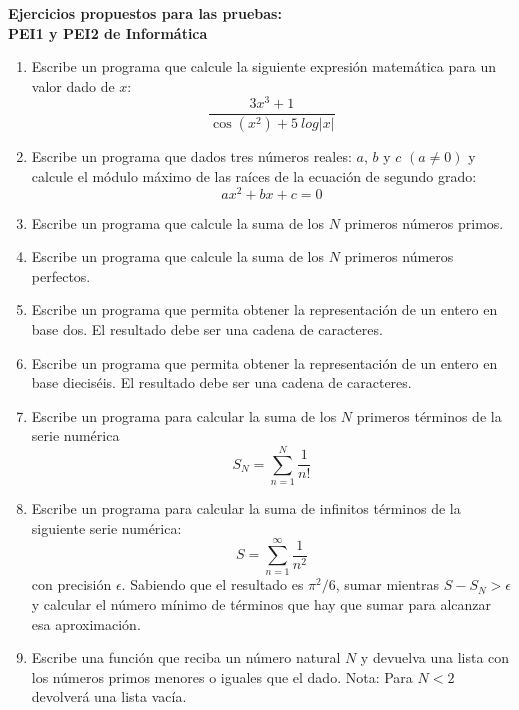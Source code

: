 \documentclass[12pt]{article}
\begin{document}
	
\begin{center} 
	{\bf \Large Ejercicios propuestos para las pruebas: \\ \vspace{0.5cm} PEI1 y PEI2 de Informática  }
\end{center} 

\vspace{1cm}
\begin{enumerate} 	
	
\item Escribe un programa que calcule la siguiente expresión matemática 
para un valor dado de $ x $: 
$$
    \frac{ 3 x^3 + 1}{   \cos(x^2) + 5 \ log|x| }
$$
	
\item Escribe un programa que dados tres números reales: $a$, $b$ y $c $ $ (a \neq 0)$ 
y calcule el módulo máximo de las raíces de la ecuación de segundo grado:
$$
a x^{2}+b x+c=0
$$


\item  Escribe un programa que calcule la suma de los $N$ primeros números primos.

\item  Escribe un programa que calcule la suma de los $ N $ primeros   números perfectos.

\item Escribe un programa que permita obtener la representación de un entero en base dos. 
El resultado debe ser una cadena de caracteres. 

\item Escribe un programa que permita obtener la representación de un entero en base dieciséis. 
El resultado debe ser una cadena de caracteres. 

\item Escribe un programa para calcular la suma de los $ N $ primeros términos de la  serie numérica 
$$
   S_N = \sum_{n=1} ^{N} \frac{1} { n! } 
$$

\item Escribe un programa para calcular la suma de infinitos términos de la siguiente serie numérica: 
$$
S = \sum_{n=1} ^{\infty} \frac{1} { n^2 } 
$$
con precisión $ \epsilon $. Sabiendo que el resultado es $ \pi^2 / 6 $, sumar mientras $ S - S_N > \epsilon $ 
y calcular el número mínimo de términos que hay que sumar para alcanzar esa aproximación. 

\item  Escribe una función que reciba un número natural $N$ y devuelva una lista con los números 
primos menores o iguales que el dado.
Nota: Para $N<2$ devolverá una lista vacía.



\end{enumerate}
\end{document}
